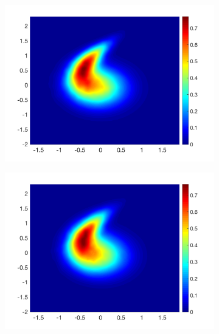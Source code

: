 \documentclass[12pt]{article}
\begin{document}
\begin{figure}[H]
	\centering
	\begin{subfigure}[b]{0.32\textwidth}
		\centering
		\includegraphics[width=\textwidth]{plots/climate_model/h1/pdf2d_data_e05_h1.png}
	\end{subfigure}
	\hfill
	\begin{subfigure}[b]{0.32\textwidth}
		\centering
		\includegraphics[width=\textwidth]{plots/climate_model/h1/pdf2d_emr_e05_h1.png}
	\end{subfigure}
	\hfill
	\begin{subfigure}[b]{0.32\textwidth}
		\centering

\end{subfigure}
\end{figure}
\end{document}

